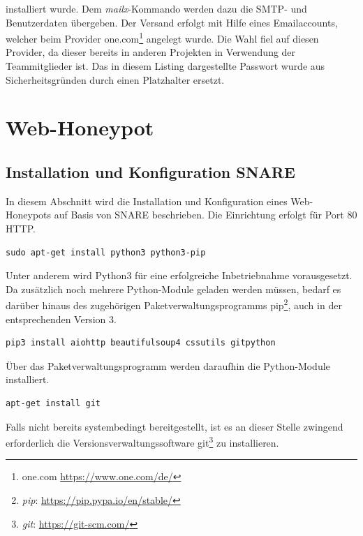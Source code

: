 installiert wurde. Dem \textit{mailx}-Kommando werden dazu die SMTP- und Benutzerdaten übergeben. Der Versand erfolgt mit Hilfe eines Emailaccounts, welcher beim Provider one.com\footnote{ one.com \url{https://www.one.com/de/}} angelegt wurde. Die Wahl fiel auf diesen Provider, da dieser bereits in anderen Projekten in Verwendung der Teammitglieder ist. Das in diesem Listing dargestellte Passwort wurde aus Sicherheitsgründen durch einen Platzhalter ersetzt.


\section{Web-Honeypot}
\label{sec:Web-Honeypot}

\subsection{Installation und Konfiguration SNARE}
\label{subsec:Installation und Konfiguration SNARE}

In diesem Abschnitt wird die Installation und Konfiguration eines Web-Honeypots auf Basis von SNARE beschrieben. Die Einrichtung erfolgt für Port 80 HTTP. 

\begin{lstlisting}[style=customc]
sudo apt-get install python3 python3-pip
\end{lstlisting}

Unter anderem wird Python3 für eine erfolgreiche Inbetriebnahme vorausgesetzt. Da zusätzlich noch mehrere Python-Module geladen werden müssen, bedarf es darüber hinaus des zugehörigen  Paketverwaltungsprogramms pip\footnote{ \textit{pip}: \url{https://pip.pypa.io/en/stable/}}, auch in der entsprechenden Version 3.

\begin{lstlisting}[style=customc]
pip3 install aiohttp beautifulsoup4 cssutils gitpython
\end{lstlisting}

Über das Paketverwaltungsprogramm werden daraufhin die Python-Module  installiert.

\begin{lstlisting}[style=customc]
apt-get install git
\end{lstlisting}

Falls nicht bereits systembedingt bereitgestellt, ist es an dieser Stelle zwingend erforderlich die Versionsverwaltungssoftware git\footnote{ \textit{git}: \url{https://git-scm.com/}} zu installieren.

